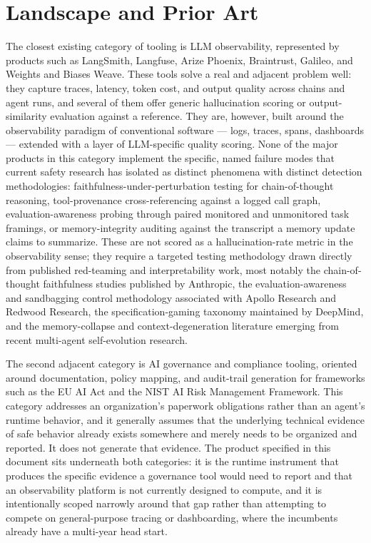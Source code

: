 \documentclass[11pt,a4paper]{article}
\begin{document}
\section{Landscape and Prior Art}

The closest existing category of tooling is LLM observability, represented by products such as LangSmith, Langfuse, Arize Phoenix, Braintrust, Galileo, and Weights and Biases Weave. These tools solve a real and adjacent problem well: they capture traces, latency, token cost, and output quality across chains and agent runs, and several of them offer generic hallucination scoring or output-similarity evaluation against a reference. They are, however, built around the observability paradigm of conventional software --- logs, traces, spans, dashboards --- extended with a layer of LLM-specific quality scoring. None of the major products in this category implement the specific, named failure modes that current safety research has isolated as distinct phenomena with distinct detection methodologies: faithfulness-under-perturbation testing for chain-of-thought reasoning, tool-provenance cross-referencing against a logged call graph, evaluation-awareness probing through paired monitored and unmonitored task framings, or memory-integrity auditing against the transcript a memory update claims to summarize. These are not scored as a hallucination-rate metric in the observability sense; they require a targeted testing methodology drawn directly from published red-teaming and interpretability work, most notably the chain-of-thought faithfulness studies published by Anthropic, the evaluation-awareness and sandbagging control methodology associated with Apollo Research and Redwood Research, the specification-gaming taxonomy maintained by DeepMind, and the memory-collapse and context-degeneration literature emerging from recent multi-agent self-evolution research.

The second adjacent category is AI governance and compliance tooling, oriented around documentation, policy mapping, and audit-trail generation for frameworks such as the EU AI Act and the NIST AI Risk Management Framework. This category addresses an organization's paperwork obligations rather than an agent's runtime behavior, and it generally assumes that the underlying technical evidence of safe behavior already exists somewhere and merely needs to be organized and reported. It does not generate that evidence. The product specified in this document sits underneath both categories: it is the runtime instrument that produces the specific evidence a governance tool would need to report and that an observability platform is not currently designed to compute, and it is intentionally scoped narrowly around that gap rather than attempting to compete on general-purpose tracing or dashboarding, where the incumbents already have a multi-year head start.
\end{document}
